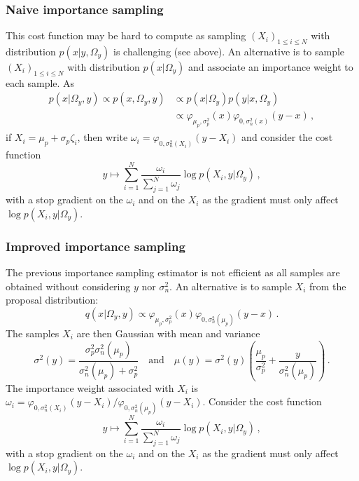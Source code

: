 \documentclass[review]{cvpr}
\begin{document}
\subsubsection{Naive importance sampling}
This cost function may be hard to compute as sampling $(X_i)_{1\leqslant i \leqslant N}$ with distribution $p(x|y,\Omega_y)$ is challenging (see above). An alternative is to sample $(X_i)_{1\leqslant i \leqslant N}$ with distribution $p(x|\Omega_y)$ and associate an importance weight to each sample. As
\begin{align*}
p(x|\Omega_y,y) \propto p(x,\Omega_y,y) &\propto p(x|\Omega_y)p(y|x,\Omega_y)\,\\
&\propto \varphi_{\mu_p,\sigma_p^2}(x)   \varphi_{0,\sigma_n^2(x)}(y-x)\,,
\end{align*}
if $X_i = \mu_p + \sigma_p \zeta_i$, then write $\omega_i = \varphi_{0,\sigma_n^2(X_i)}(y-X_i)$ and consider the cost function
$$
y \mapsto \sum_{i=1}^N\frac{\omega_i}{\sum_{j=1}^N\omega_j} \log p(X_i,y|\Omega_y)\,,
$$
with a stop gradient on the $\omega_i$ and on the $X_i$ as the gradient must only affect $ \log p(X_i,y|\Omega_y)$. 

\subsubsection{Improved importance sampling}
The previous importance sampling estimator is not efficient as all samples are obtained without considering $y$ nor $\sigma_n^2$. An alternative is to sample $X_i$ from the proposal distribution:
$$
q(x|\Omega_y,y)\propto \varphi_{\mu_p,\sigma_p^2}(x)   \varphi_{0,\sigma_n^2(\mu_p)}(y-x)\,.
$$
The samples $X_i$ are then Gaussian with mean and variance 
$$
\sigma^2(y) = \frac{\sigma_p^2\sigma_n^2(\mu_p)}{\sigma_n^2(\mu_p)+\sigma_p^2} \quad\mbox{and}\quad \mu(y) = \sigma^2(y)\left(\frac{\mu_p}{\sigma_p^2} + \frac{y}{\sigma_n^2(\mu_p)}\right)\,.$$
The importance weight associated with $X_i$ is $\omega_i = \varphi_{0,\sigma_n^2(X_i)}(y-X_i)/\varphi_{0,\sigma_n^2(\mu_p)}(y-X_i)$. Consider the cost function
$$
y \mapsto \sum_{i=1}^N\frac{\omega_i}{\sum_{j=1}^N\omega_j}  \log p(X_i,y|\Omega_y)\,,
$$
with a stop gradient on the $\omega_i$ and on the $X_i$ as the gradient must only affect $ \log p(X_i,y|\Omega_y)$.
\end{document}
